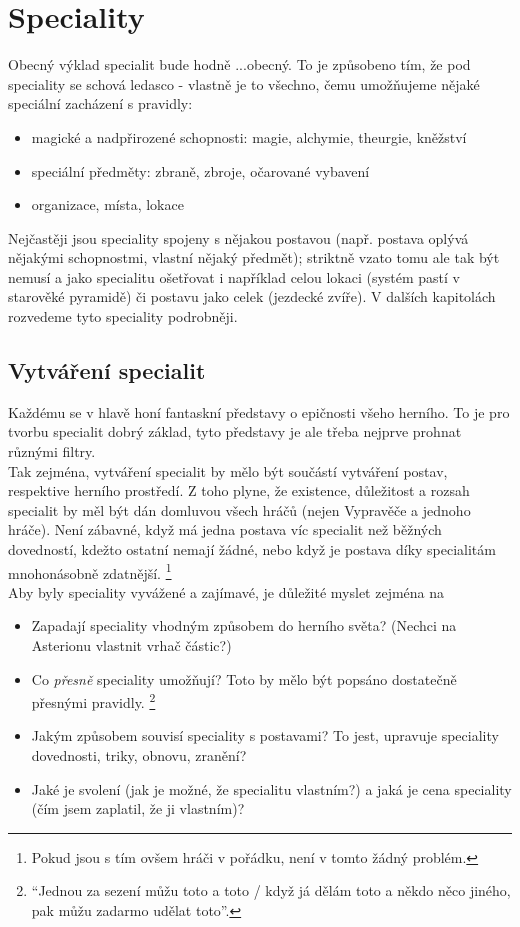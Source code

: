 \chapter{Speciality}

Obecný výklad specialit bude hodně ...obecný. To je způsobeno tím, že pod speciality se schová ledasco - vlastně je to všechno, čemu umožňujeme nějaké speciální zacházení s pravidly:

\begin{itemize}
\item magické a nadpřirozené schopnosti: magie, alchymie, theurgie, kněžství
\item speciální předměty: zbraně, zbroje, očarované vybavení
\item organizace, místa, lokace
\end{itemize}

Nejčastěji jsou speciality spojeny s nějakou postavou (např. postava oplývá nějakými schopnostmi, vlastní nějaký předmět); striktně vzato tomu ale tak být nemusí a jako specialitu ošetřovat i například celou lokaci (systém pastí v starověké pyramidě) či postavu jako celek (jezdecké zvíře). V dalších kapitolách rozvedeme tyto speciality podrobněji.

\section{Vytváření specialit}
\label{sec:spec-vytvareni}
Každému se v hlavě honí fantaskní představy o epičnosti všeho herního. To je pro tvorbu specialit dobrý základ, tyto představy je ale třeba nejprve prohnat různými filtry.\\
Tak zejména, vytváření specialit by mělo být součástí vytváření postav, respektive herního prostředí. Z toho plyne, že existence, důležitost a rozsah specialit by měl být dán domluvou všech hráčů (nejen Vypravěče a jednoho hráče). Není zábavné, když má jedna postava víc specialit než běžných dovedností, kdežto ostatní nemají žádné, nebo když je postava díky specialitám mnohonásobně zdatnější. \footnote{Pokud jsou s tím ovšem hráči v pořádku, není v tomto žádný problém.}\\
Aby byly speciality vyvážené a zajímavé, je důležité myslet zejména na

\begin{itemize}
\item Zapadají speciality vhodným způsobem do herního světa? (Nechci na Asterionu vlastnit vrhač částic?)
\item Co \textit{přesně} speciality umožňují? Toto by mělo být popsáno dostatečně přesnými pravidly. \footnote{``Jednou za sezení můžu toto a toto / když já dělám toto a někdo něco jiného, pak můžu zadarmo udělat toto''.}
\item Jakým způsobem souvisí speciality s postavami? To jest, upravuje speciality dovednosti, triky, obnovu, zranění?
\item Jaké je svolení (jak je možné, že specialitu vlastním?) a jaká je cena speciality (čím jsem zaplatil, že ji vlastním)?
\end{itemize}


